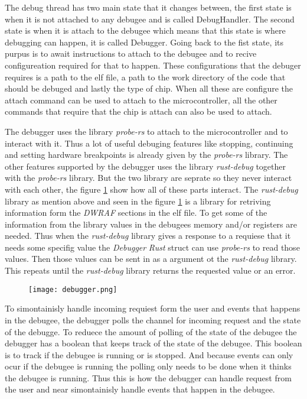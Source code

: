 
The debug thread has two main state that it changes between, the first state is when it is not attached to any \gls{debugee} and is called DebugHandler.
The second state is when it is attach to the \gls{debugee} which means that this state is where debugging can happen, it is called Debugger.
Going back to the fist state, its purpus is to await instructions to attach to the \gls{debugee} and to recive configureation required for that to happen.
These configurations that the debuger requires is a path to the elf file, a path to the work directory of the code that should be debuged and lastly the type of chip.
When all these are configure the attach command can be used to attach to the microcontroller, all the other commands that require that the chip is attach can also be used to attach.


The debugger uses the library \emph{probe-rs} \cite{probe} to attach to the microcontroller and to interact with it.
Thus a lot of useful debuging features like stopping, continuing and setting hardware breakpoints is already given by the \emph{probe-rs} library.
The other features supported by the debugger uses the library \emph{rust-debug} together with the \emph{probe-rs} library.
But the two library are seprate so they never interact with each other, the figure \ref{fig:debugger} show how all of these parts interact.
The \emph{rust-debug} library as mention above and seen in the figure \ref{fig:debugger} is a library for retriving information form the \emph{DWRAF} sections in the \gls{elf} file.
To get some of the information from the library values in the \glspl{debugee} memory and/or registers are needed.
Thus when the \emph{rust-debug} library gives a response to a requiese that it needs some specifig value the \emph{Debugger} \emph{Rust} struct can use \emph{probe-rs} to read those values.
Then those values can be sent in as a argument ot the \emph{rust-debug} library.
This repeats until the \emph{rust-debug} library returns the requested value or an error.


\begin{figure}[h]
    \centering
    \texttt{[image: debugger.png]}
    \label{fig:debugger}
\end{figure}


To simontainisly handle incoming requiest form the user and events that happens in the \gls{debugee}, the debugger polls the channel for incoming request and the state of the debugge.
To reduece the amount of polling of the state of the \gls{debugee} the debugger has a boolean that keeps track of the state of the \gls{debugee}.
This boolean is to track if the \gls{debugee} is running or is stopped.
And because events can only ocur if the \gls{debugee} is running the polling only needs to be done when it thinks the \gls{debugee} is running.
Thus this is how the debugger can handle request from the user and near simontainisly handle events that happen in the \gls{debugee}.


